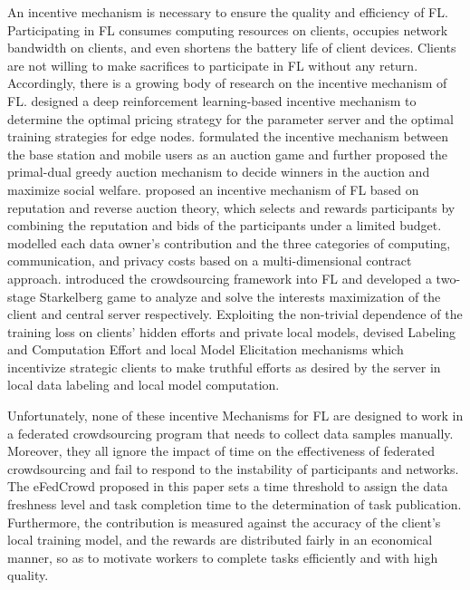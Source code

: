 \documentclass[final,1p,times]{elsarticle}
\begin{document}
An incentive mechanism is necessary to ensure the quality and efficiency of FL. Participating in FL consumes computing resources on clients, occupies network bandwidth on clients, and even shortens the battery life of client devices. Clients are not willing to make sacrifices to participate in FL without any return. Accordingly, there is a growing body of research on the incentive mechanism of FL. \cite{zhan2020learn} designed a deep reinforcement learning-based incentive mechanism to determine the optimal pricing strategy for the parameter server and the optimal training strategies for edge nodes. \cite{le2021incentive} formulated the incentive mechanism between the base station and mobile users as an auction game and further proposed the primal-dual greedy auction mechanism to decide winners in the auction and maximize social welfare. \cite{zhang2021incentive} proposed an incentive mechanism of FL based on reputation and reverse auction theory, which selects and rewards participants by combining the reputation and bids of the participants under a limited budget. \cite{9317806} modelled each data owner's contribution and the three categories of computing, communication, and privacy costs based on a multi-dimensional contract approach. \cite{pandey2019incentivize} introduced the crowdsourcing framework into FL and developed a two-stage Starkelberg game to analyze and solve the interests maximization of the client and central server respectively. Exploiting the non-trivial dependence of the training loss on clients’ hidden efforts and private local models, \cite{zhao2023truthful} devised Labeling and Computation Effort and local Model Elicitation mechanisms which incentivize strategic clients to make truthful efforts as desired by the server in local data labeling and local model computation.

Unfortunately, none of these incentive Mechanisms for FL are designed to work in a federated crowdsourcing program that needs to collect data samples manually. Moreover, they all ignore the impact of time on the effectiveness of federated crowdsourcing and fail to respond to the instability of participants and networks. The eFedCrowd proposed in this paper sets a time threshold to assign the data freshness level and task completion time to the determination of task publication. Furthermore, the contribution is measured against the accuracy of the client's local training model, and the rewards are distributed fairly in an economical manner, so as to motivate workers to complete tasks efficiently and with high quality.    	 


\end{document}
